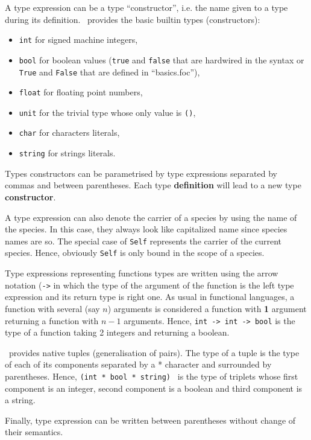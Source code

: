 A type expression can be a type ``constructor'', i.e. the name given
to a type during its definition. \focal\ provides the basic builtin
types (constructors):
\begin{itemize}
  \item {\tt int} for signed machine integers,
  \item {\tt bool} for boolean values ({\tt true} and {\tt false} that
    are hardwired in the syntax or {\tt True} and {\tt False} that are
    defined in ``basics.foc''),
  \item {\tt float} for floating point numbers,
  \item {\tt unit} for the trivial type whose only value is {\tt ()},
  \item {\tt char} for characters literals,
  \item {\tt string} for strings literals.
\end{itemize}
Types constructors can be parametrised by type expressions separated
by commas and between parentheses. Each type {\bf definition} will
lead to a new type {\bf constructor}.

A type expression can also denote the carrier of a species by using
the name of the species. In this case, they always look like
capitalized name since species names are so. The special case of
{\tt Self} represents the carrier of the current species. Hence,
obviously {\tt Self} is only bound in the scope of a species.

Type expressions representing functions types are written using the
arrow notation ({\tt ->} in which the type of the argument of the
function is the left type expression and its return type is right
one. As usual in functional languages, a function with several (say
$n$) arguments is considered a function with {\bf 1} argument
returning a function with $n-1$ arguments. Hence,
{\tt int -> int -> bool} is the type of a function taking 2 integers
and returning a boolean.

\focal\ provides native tuples (generalisation of pairs). The type of
a tuple is the type of each of its components separated by a *
character and surrounded by parentheses. Hence,
{\tt (int * bool * string) } is the type of triplets whose first
component is an integer, second component is a boolean and third
component is a string.

Finally, type expression can be written between parentheses without
change of their semantics.



